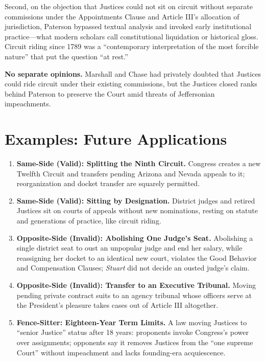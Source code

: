 \documentclass[12pt]{article}
\begin{document}
Second, on the objection that Justices could not sit on circuit without separate commissions under the Appointments Clause and Article III's allocation of jurisdiction, Paterson bypassed textual analysis and invoked early institutional practice---what modern scholars call constitutional liquidation or historical gloss. Circuit riding since 1789 was a ``contemporary interpretation of the most forcible nature'' that put the question ``at rest.''

\textbf{No separate opinions.} Marshall and Chase had privately doubted that Justices could ride circuit under their existing commissions, but the Justices closed ranks behind Paterson to preserve the Court amid threats of Jeffersonian impeachments.

\section{Examples: Future Applications}

\begin{enumerate}
\item \textbf{Same-Side (Valid): Splitting the Ninth Circuit.} Congress creates a new Twelfth Circuit and transfers pending Arizona and Nevada appeals to it; reorganization and docket transfer are squarely permitted.
\item \textbf{Same-Side (Valid): Sitting by Designation.} District judges and retired Justices sit on courts of appeals without new nominations, resting on statute and generations of practice, like circuit riding.
\item \textbf{Opposite-Side (Invalid): Abolishing One Judge's Seat.} Abolishing a single district seat to oust an unpopular judge and end her salary, while reassigning her docket to an identical new court, violates the Good Behavior and Compensation Clauses; \textit{Stuart} did not decide an ousted judge's claim.
\item \textbf{Opposite-Side (Invalid): Transfer to an Executive Tribunal.} Moving pending private contract suits to an agency tribunal whose officers serve at the President's pleasure takes cases out of Article III altogether.
\item \textbf{Fence-Sitter: Eighteen-Year Term Limits.} A law moving Justices to ``senior Justice'' status after 18 years: proponents invoke Congress's power over assignments; opponents say it removes Justices from the ``one supreme Court'' without impeachment and lacks founding-era acquiescence.
\end{enumerate}
\end{document}
